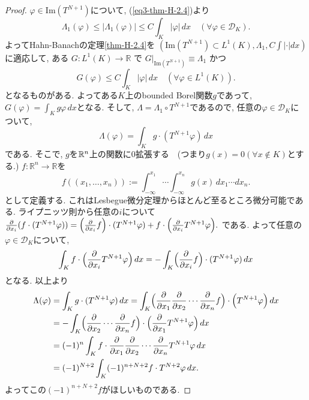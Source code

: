 \begin{proof}
$\varphi \in \mathrm{Im}(T^{N+1}) $について, (\ref{eq3-thm-H-2.4})より
\[
\Lambda_1(\varphi) \leq |\Lambda_1(\varphi)| \leq C \int_K |\varphi| \, dx \quad (\forall \varphi \in \mathcal{D}_K).
\]
よってHahn-Banachの定理\ref{thm-H-2.4}を
\((\mathrm{Im}(T^{N+1}) \subset L^1(K), \Lambda_1, C \int |\cdot| dx)\)に適応して, 
ある \( G : L^1(K) \to \mathbb{R}\) で  \(G|_{\mathrm{Im}(T^{N+1})} \equiv \Lambda_1\) かつ
\[
G(\varphi) \leq C \int_K |\varphi| \, dx \quad (\forall \varphi \in L^1(K)).
\]
となるものがある. 
よってある$K$上のbounded Borel関数\(g \)であって, 
\(G(\varphi) = \int_K g\varphi \, dx \)となる. 
そして,  \(\Lambda = \Lambda_1 \circ T^{N+1}\)であるので, 任意の$\varphi \in \mathcal{D}_K$について, 
\[
\Lambda(\varphi)
 = \int_K g \cdot (T^{N+1}\varphi)\, dx
\]
である. 
そこで, $g$を$\mathbb{R}^n$上の関数に0拡張する　(つまり$g(x)=0 (\forall x \notin K)$とする.)
 \(f : \mathbb{R}^n \to \mathbb{R}\)を
\[
f((x_1,\ldots,x_n)) := \int_{-\infty}^{x_1}\cdots \int_{-\infty}^{x_n} g(x)\, dx_1 \cdots dx_n.
\]
として定義する. 
これはLesbegue微分定理からほとんど至るところ微分可能である. 
ライプニッツ則から任意の$i$について
\(\frac{\partial}{\partial x_i}(f \cdot (T^{N+1}\varphi)) 
= \Bigl(\frac{\partial}{\partial x_i} f\Bigr)\cdot (T^{N+1}\varphi) + f\cdot \Bigl(\frac{\partial}{\partial x_i} T^{N+1}\varphi\Bigr).\)
である. よって任意の\(\varphi \in \mathcal{D}_K\)について, 
\[ \int_K f\cdot \Bigl(\frac{\partial}{\partial x_i} T^{N+1}\varphi\Bigr)\, dx
= - \int_K \Bigl(\frac{\partial}{\partial x_i} f\Bigr)\cdot (T^{N+1}\varphi)\, dx
\]
となる. 以上より
\begin{align*}
\Lambda(\varphi) 
&= \int_K g \cdot (T^{N+1}\varphi)\, dx 
= \int_K \Bigl(\frac{\partial}{\partial x_1}\frac{\partial}{\partial x_2}\cdots \frac{\partial}{\partial x_n} f \Bigr) \cdot \Bigl( T^{N+1}\varphi\Bigr)\, dx \\
&= - \int_K \Bigl(\frac{\partial}{\partial x_2}\cdots \frac{\partial}{\partial x_n} f\Bigr)\cdot \Bigl(\frac{\partial}{\partial x_1} T^{N+1}\varphi\Bigr)\, dx \\
& = (-1)^n \int_K f\cdot \frac{\partial}{\partial x_1}\frac{\partial}{\partial x_2}\cdots \frac{\partial}{\partial x_n} T^{N+1}\varphi \, dx \\
&= (-1)^{N+2} \int_K (-1)^{n+N+2}f\cdot T^{N+2}\varphi \, dx.
\end{align*}
よってこの$(-1)^{n+N+2}f$がほしいものである. 
\end{proof}


